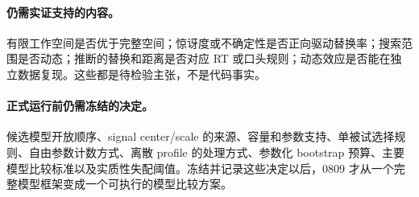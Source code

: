 \paragraph{仍需实证支持的内容。}
有限工作空间是否优于完整空间；惊讶度或不确定性是否正向驱动替换率；搜索范围是否动态；推断的替换和距离是否对应 RT 或口头规则；动态效应是否能在独立数据复现。这些都是待检验主张，不是代码事实。

\paragraph{正式运行前仍需冻结的决定。}
候选模型开放顺序、signal center/scale 的来源、容量和参数支持、单被试选择规则、自由参数计数方式、离散 profile 的处理方式、参数化 bootstrap 预算、主要模型比较标准以及实质性失配阈值。冻结并记录这些决定以后，0809 才从一个完整模型框架变成一个可执行的模型比较方案。
